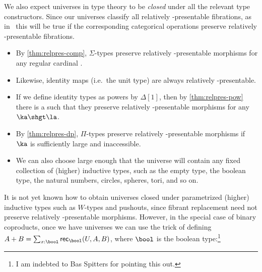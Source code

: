 We also expect universes in type theory to be \emph{closed} under all the relevant type constructors.
Since our universes classify all relatively \ka-presentable fibrations, as in~\cite{klv:ssetmodel} this will be true if the corresponding categorical operations preserve relatively \ka-presentable fibrations.
\begin{itemize}
\item By \cref{thm:relpres-comp}, $\Sigma$-types preserve relatively \ka-presentable morphisms for any regular cardinal \ka.
\item Likewise, identity maps (i.e.\ the unit type) are always relatively \ka-presentable.
\item If we define identity types as powers by $\Delta[1]$, then by \cref{thm:relpres-pow} there is a \la such that they preserve relatively \ka-presentable morphisms for any $\ka\shgt\la$.
\item By \cref{thm:relpres-dp}, $\Pi$-types preserve relatively \ka-presentable morphisms if $\ka$ is sufficiently large and inaccessible.
\item We can also choose \ka large enough that the universe will contain any fixed collection of (higher) inductive types, such as the empty type, the boolean type, the natural numbers, circles, spheres, tori, and so on.
\end{itemize}
It is not yet known how to obtain universes closed under parametrized (higher) inductive types such as $W$-types and pushouts, since fibrant replacement need not preserve relatively \ka-presentable morphisms.
However, in the special case of binary coproducts, once we have universes we can use the trick of defining $A+B = \sum_{x:\bool} \mathsf{rec}_\bool(U,A,B)$, where $\bool$ is the boolean type:\footnote{I am indebted to Bas Spitters for pointing this out.}

